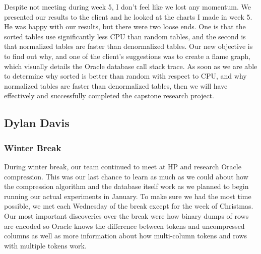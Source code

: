 \documentclass[10pt]{article}
\begin{document}
Despite not meeting during week 5, I don't feel like we lost any momentum. We presented our results to the client and he looked at the charts I made in week 5. He was happy with our results, but there were two loose ends. One is that the sorted tables use significantly less CPU than random tables, and the second is that normalized tables are faster than denormalized tables. Our new objective is to find out why, and one of the client's suggestions was to create a flame graph, which visually details the Oracle database call stack trace. As soon as we are able to determine why sorted is better than random with respect to CPU, and why normalized tables are faster than denormalized tables, then we will have effectively and successfully completed the capstone research project. 

\subsection{Dylan Davis}

\subsubsection{Winter Break}
During winter break, our team continued to meet at HP and research Oracle compression. This was our last 
chance to learn as much as we could about how the compression algorithm and the database itself work as we 
planned to begin running our actual experiments in January. To make sure we had the most time possible, we met 
each Wednesday of the break except for the week of Christmas. Our most important discoveries over the break were 
how binary dumps of rows are encoded so Oracle knows the difference between tokens and uncompressed columns as 
well as more information about how multi-column tokens and rows with multiple tokens work.
\end{document}
